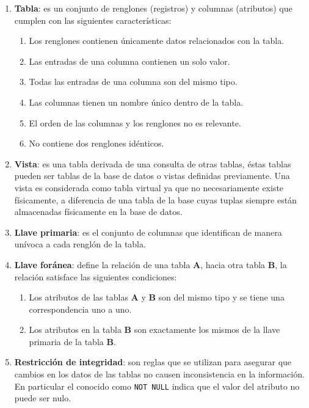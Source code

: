 \begin{enumerate}
	\item \textbf{Tabla}: es un conjunto de renglones (registros) y columnas (atributos) que cumplen con las siguientes características\cite{DataBaseConcepts}:
	\begin{enumerate}
		\item Los renglones contienen únicamente datos relacionados con la tabla.
		\item Las entradas de una columna contienen un solo valor.
		\item Todas las entradas de una columna son del mismo tipo.
		\item Las columnas tienen un nombre único dentro de la tabla.
		\item El orden de las columnas y los renglones no es relevante.
		\item No contiene dos renglones idénticos.
	\end{enumerate}
	\item \textbf{Vista}: es una tabla derivada de una consulta de otras tablas, éstas tablas pueden ser tablas de la base de datos o vistas definidas previamente. Una vista es considerada como tabla virtual ya que no necesariamente existe físicamente, a diferencia de una tabla de la base cuyas tuplas siempre están almacenadas físicamente en la base de datos\cite{FundamentalsOfDBSystems}.
	\item \textbf{Llave primaria}: es el conjunto de columnas que identifican de manera unívoca a cada renglón de la tabla.\cite{DataBaseConcepts}
	\item \textbf{Llave foránea}: define la relación de una tabla \textbf{A}, hacia otra tabla \textbf{B}, la relación satisface las siguientes condiciones\cite{FundamentalsOfDBSystems, DataBaseConcepts}:
	\begin{enumerate}
		\item Los atributos de las tablas \textbf{A} y \textbf{B} son del mismo tipo y se tiene una correspondencia uno a uno.
		\item Los atributos en la tabla \textbf{B} son exactamente los mismos de la llave primaria de la tabla \textbf{B}.
	\end{enumerate}
	\item \textbf{Restricción de integridad}: son reglas que se utilizan para asegurar que cambios en los datos de las tablas no causen inconsistencia en la información\cite{DatabaseSystemConcepts}. En particular el conocido como \texttt{NOT NULL} indica que el valor del atributo no puede ser nulo\cite{FundamentosSistemasBasesDatos}.

\end{enumerate}
